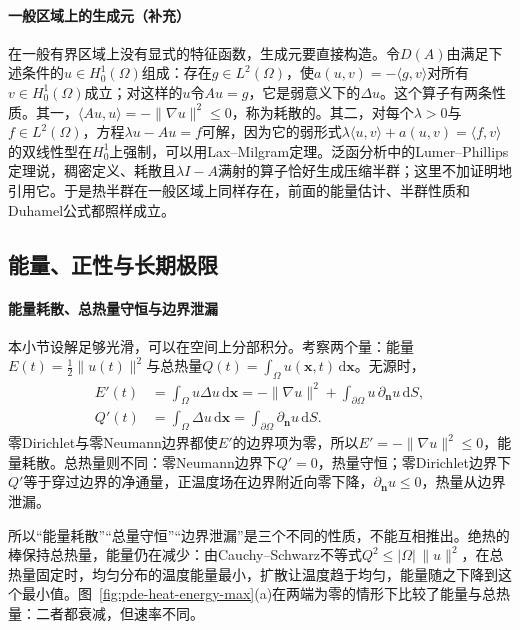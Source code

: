 \paragraph{一般区域上的生成元（补充）}
在一般有界区域上没有显式的特征函数，生成元要直接构造。令$D(A)$由满足下述条件的$u\in H_0^1(\Omega)$组成：存在$g\in L^2(\Omega)$，使$a(u,v)=-\langle g,v\rangle$对所有$v\in H_0^1(\Omega)$成立；对这样的$u$令$Au=g$，它是弱意义下的$\Delta u$。这个算子有两条性质。其一，$\langle Au,u\rangle=-\|\nabla u\|^2\leq0$，称为耗散的。其二，对每个$\lambda>0$与$f\in L^2(\Omega)$，方程$\lambda u-Au=f$可解，因为它的弱形式$\lambda\langle u,v\rangle+a(u,v)=\langle f,v\rangle$的双线性型在$H_0^1$上强制，可以用Lax--Milgram定理。泛函分析中的Lumer--Phillips定理说，稠密定义、耗散且$\lambda I-A$满射的算子恰好生成压缩半群；这里不加证明地引用它。于是热半群在一般区域上同样存在，前面的能量估计、半群性质和Duhamel公式都照样成立。

\subsection{能量、正性与长期极限}
\label{sec:pde-heat-long-time}

\paragraph{能量耗散、总热量守恒与边界泄漏}
本小节设解足够光滑，可以在空间上分部积分。考察两个量：能量$E(t)=\tfrac12\|u(t)\|^2$与总热量$Q(t)=\int_\Omega u(\bm x,t)\,\mathrm d\bm x$。无源时，
\[
  \begin{aligned}
    E'(t)&=\int_\Omega u\Delta u\,\mathrm d\bm x=-\|\nabla u\|^2+\int_{\partial\Omega}u\,\partial_{\bm n}u\,\mathrm dS,\\
    Q'(t)&=\int_\Omega\Delta u\,\mathrm d\bm x=\int_{\partial\Omega}\partial_{\bm n}u\,\mathrm dS .
  \end{aligned}
\]
零Dirichlet与零Neumann边界都使$E'$的边界项为零，所以$E'=-\|\nabla u\|^2\leq0$，能量耗散。总热量则不同：零Neumann边界下$Q'=0$，热量守恒；零Dirichlet边界下$Q'$等于穿过边界的净通量，正温度场在边界附近向零下降，$\partial_{\bm n}u\leq0$，热量从边界泄漏。

所以“能量耗散”“总量守恒”“边界泄漏”是三个不同的性质，不能互相推出。绝热的棒保持总热量，能量仍在减少：由Cauchy--Schwarz不等式$Q^2\leq|\Omega|\,\|u\|^2$，在总热量固定时，均匀分布的温度能量最小，扩散让温度趋于均匀，能量随之下降到这个最小值。图~\ref{fig:pde-heat-energy-max}(a)在两端为零的情形下比较了能量与总热量：二者都衰减，但速率不同。

